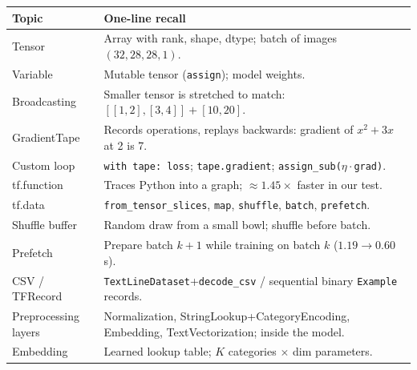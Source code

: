\begin{revision}
\begin{center}\small
\begin{tabular}{@{}p{3.6cm}p{9.6cm}@{}}
\toprule
\textbf{Topic} & \textbf{One-line recall}\\
\midrule
Tensor & Array with rank, shape, dtype; batch of images $(32,28,28,1)$.\\
Variable & Mutable tensor (\texttt{assign}); model weights.\\
Broadcasting & Smaller tensor is stretched to match: $[[1,2],[3,4]]+[10,20]$.\\
GradientTape & Records operations, replays backwards: gradient of $x^2+3x$ at 2 is 7.\\
Custom loop & \texttt{with tape: loss}; \texttt{tape.gradient}; \texttt{assign\_sub($\eta\cdot$grad)}.\\
tf.function & Traces Python into a graph; $\approx1.45\times$ faster in our test.\\
tf.data & \texttt{from\_tensor\_slices}, \texttt{map}, \texttt{shuffle}, \texttt{batch}, \texttt{prefetch}.\\
Shuffle buffer & Random draw from a small bowl; shuffle before batch.\\
Prefetch & Prepare batch $k+1$ while training on batch $k$ ($1.19\to0.60$ s).\\
CSV / TFRecord & \texttt{TextLineDataset}+\texttt{decode\_csv} / sequential binary \texttt{Example} records.\\
Preprocessing layers & Normalization, StringLookup+CategoryEncoding, Embedding, TextVectorization; inside the model.\\
Embedding & Learned lookup table; $K$ categories $\times$ dim parameters.\\
\bottomrule
\end{tabular}
\end{center}
\end{revision}
